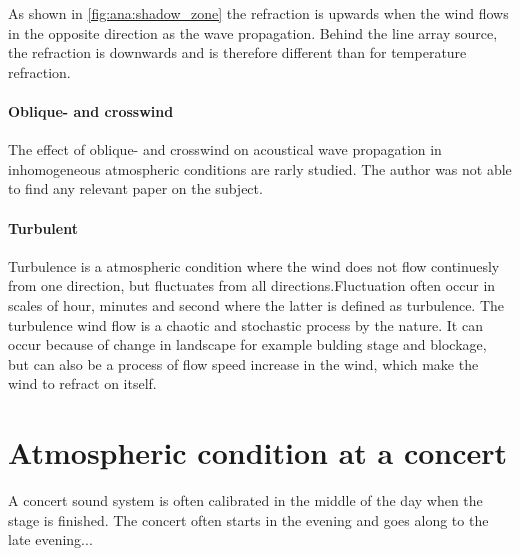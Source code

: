 As shown in \autoref{fig:ana:shadow_zone} the refraction is upwards when the wind flows in the opposite direction as the wave propagation. Behind the line array source, the refraction is downwards and is therefore different than for temperature refraction.

\paragraph{Oblique- and crosswind} The effect of oblique- and crosswind on acoustical wave propagation in inhomogeneous atmospheric conditions are rarly studied.  The author was not able to find any relevant paper on the subject.

\paragraph{Turbulent} Turbulence is a atmospheric condition where the wind does not flow continuesly from one direction, but fluctuates from all directions.Fluctuation often occur in scales of hour, minutes and second where the latter is defined as turbulence. The turbulence wind flow is a chaotic and stochastic process by the nature. It can occur because of change in landscape for example bulding stage and blockage, but can also be a process of flow speed increase in the wind, which make the wind to refract on itself. 


 \section{Atmospheric condition at a concert}
A concert sound system is often calibrated in the middle of the day when the stage is finished. The concert often starts in the evening and goes along to the late evening...















